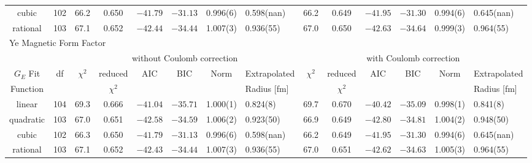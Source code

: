 \documentclass[10pt,aps,prc,twocolumn]{revtex4-1}
\begin{document}
\begin{table}
\begin{tabular}{cc|cccccl|cccccl}
cubic     & 102 &  66.2    & 0.650     &$-41.79$&$-31.13$& 0.996(6)  & 0.598(nan)&  66.2    & 0.649     &$-41.95$&$-31.30$& 0.994(6)  & 0.645(nan)    \\ 
rational  & 103 &  67.1    & 0.652     &$-42.44$&$-34.44$& 1.007(3)  & 0.936(55) &  67.0    & 0.650     &$-42.63$&$-34.64$& 0.999(3)  & 0.964(55)    \\ \hline \hline
\multicolumn{14}{l}{Ye Magnetic Form Factor}                                      \\ \hline
          &     & \multicolumn{6}{c}{without Coulomb correction}                 & \multicolumn{6}{|c}{with Coulomb correction} \\
$G_E$ Fit & df  & $\chi^2$ & reduced   & AIC    & BIC    & Norm      & Extrapolated & $\chi^2$ & reduced   & AIC    & BIC    & Norm      & Extrapolated      \\  
Function  &     &          &$\chi^2$   &        &        &           & Radius [fm]      &          & $\chi^2$  &        &        &       & Radius [fm]     \\ \hline
linear    & 104 &  69.3    & 0.666     &$-41.04$&$-35.71$& 1.000(1)  & 0.824(8)  &  69.7    & 0.670     &$-40.42$&$-35.09$& 0.998(1)  & 0.841(8)    \\
quadratic & 103 &  67.0    & 0.651     &$-42.58$&$-34.59$& 1.006(2)  & 0.923(50) &  66.9    & 0.649     &$-42.80$&$-34.81$& 1.004(2)  & 0.948(50)    \\
cubic     & 102 &  66.3    & 0.650     &$-41.79$&$-31.13$& 0.996(6)  & 0.598(nan)&  66.2    & 0.649     &$-41.95$&$-31.30$& 0.994(6)  & 0.645(nan)    \\ 
rational  & 103 &  67.1    & 0.652     &$-42.43$&$-34.44$& 1.007(3)  & 0.936(55) &  67.0    & 0.651     &$-42.62$&$-34.63$& 1.005(3)  & 0.964(55)    \\ \hline \hline
\end{tabular}
\label{lowestdatatable}
\end{table}
\end{document}
